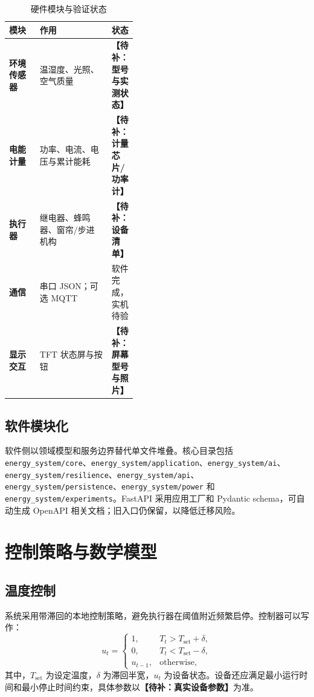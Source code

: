 \documentclass[UTF8,a4paper,zihao=-4]{ctexart}
\newcommand{\placeholder}[1]{\textcolor{EcoOrange}{\textbf{【待补：#1】}}}
\begin{document}
\begin{table}[htbp]\centering\caption{硬件模块与验证状态}\begin{tabularx}{\linewidth}{>{\bfseries}p{0.24\linewidth}X p{0.18\linewidth}}\toprule 模块 & 作用 & 状态\\\midrule 环境传感器 & 温湿度、光照、空气质量 & \placeholder{型号与实测状态}\\ 电能计量 & 功率、电流、电压与累计能耗 & \placeholder{计量芯片/功率计}\\ 执行器 & 继电器、蜂鸣器、窗帘/步进机构 & \placeholder{设备清单}\\ 通信 & 串口 JSON；可选 MQTT & 软件完成，实机待验\\ 显示交互 & TFT 状态屏与按钮 & \placeholder{屏幕型号与照片}\\\bottomrule\end{tabularx}\end{table}

\subsection{软件模块化}
软件侧以领域模型和服务边界替代单文件堆叠。核心目录包括 \texttt{energy\_system/core}、\texttt{energy\_system/application}、\texttt{energy\_system/ai}、\texttt{energy\_system/resilience}、\texttt{energy\_system/api}、\texttt{energy\_system/persistence}、\texttt{energy\_system/power} 和 \texttt{energy\_system/experiments}。FastAPI 采用应用工厂和 Pydantic schema，可自动生成 OpenAPI 相关文档\cite{fastapi}；旧入口仍保留，以降低迁移风险。
\section{控制策略与数学模型}
\subsection{温度控制}
系统采用带滞回的本地控制策略，避免执行器在阈值附近频繁启停。控制器可以写作：
\begin{equation}\label{eq:control}
 u_t=\begin{cases}1,&T_t>T_{\mathrm{set}}+\delta,\\0,&T_t<T_{\mathrm{set}}-\delta,\\u_{t-1},&\text{otherwise},\end{cases}
\end{equation}
其中，\(T_{\mathrm{set}}\) 为设定温度，\(\delta\) 为滞回半宽，\(u_t\) 为设备状态。设备还应满足最小运行时间和最小停止时间约束，具体参数以\placeholder{真实设备参数}为准。
\end{document}
